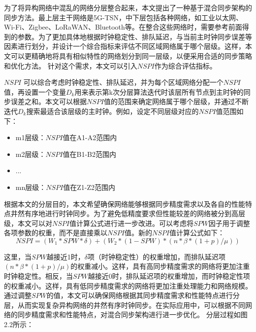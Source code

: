 \documentclass[UTF8,a4paper,12pt]{ctexart}
\numberwithin{equation}{section}
\begin{document}
为了将异构网络中混乱的网络分层整合起来，本文提出了一种基于混合同步架构的同步方法。最上层主干网络是5G-TSN，中下层包括各种网络，如工业以太网、Wi-Fi、Zigbee、LoRaWAN、Bluetooth等。在整合这些网络时，需要参考前面得到的参数。为了更加具体地根据时钟稳定性、排队延迟，与当前主时钟同步误差等因素进行划分，并设计一个综合指标来评估不同区域网络属于哪个层级。这样，本文可以更精确地将具有相似特性的网络划分到同一层级，以便采用合适的同步策略和优化方法。
针对这个需求，本文可以引入$NSPI$作为综合评估指标。

$NSPI$ 可以综合考虑时钟稳定性、排队延迟，并为每个区域网络分配一个$NSPI$值，再设置一个变量$D_k$用来表示第k次分层算法迭代时该层所有节点到主时钟的同步误差之和。本文可以根据$NSPI$值的范围来确定网络属于哪个层级，并通过不断迭代$D_k$搜索最适合该层级的主时钟。例如，设定不同层级对应的$NSPI$值范围如下：
\begin{itemize}
	\item m1层级：$NSPI$值在A1-A2范围内
	\item m2层级：$NSPI$值在B1-B2范围内
	\item ...
	\item mn层级：$NSPI$值在Z1-Z2范围内
\end{itemize}

根据本文的分层目的，本文希望确保网络能够根据同步精度需求以及各自的性能特点井然有序地进行时钟同步。为了避免低精度要求但性能较差的网络被分到高层级，本文可以对$NSPI$值计算公式进行进一步改进。可以考虑将$SPW$因子用于调整各项参数的权重，而不是直接乘以$NSPI$值。新的$NSPI$值计算公式如下：
\begin{equation}
	NSPI = (W_1 * SPW * \delta) + (W_2 * (1 - SPW) * (n * \beta * (1 + p) / \mu)) 
\end{equation}

这里，当$SPW$越接近1时，$\delta$项（时钟稳定性）的权重增加，而排队延迟项$(n * \beta * (1 + p) / \mu)$的权重减小。这样，具有高同步精度需求的网络将更加注重时钟稳定性。相反，当$SPW$越接近0时，排队延迟项的权重增加，而时钟稳定性项的权重减小。这样，具有低同步精度需求的网络将更加注重处理能力和网络规模。
通过调整$SPW$的值，本文可以确保网络根据其同步精度需求和性能特点进行分层，从而实现复杂异构网络的井然有序时钟同步。在实际应用中，可以根据不同网络的同步精度需求和性能特点，对混合同步架构进行进一步优化。
分层过程如图2.2所示：
\end{document}
